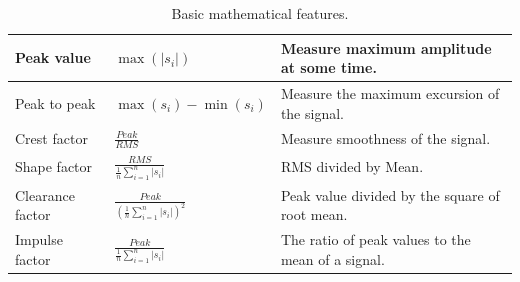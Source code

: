 \begin{table}[ht]
\begin{tabular}{|p{3cm}|p{3cm}|p{6cm}|}
		\vspace{-1mm} Peak value & \vspace{-1mm} \begin{math} \max(|s_{i}|) \end{math} & \vspace{-1mm} Measure maximum amplitude at some time. \\[3ex]
		\hline
		
		\vspace{-1mm} Peak to peak & \vspace{-1mm} \begin{math} \max(s_{i}) - \min(s_{i}) \end{math} & \vspace{-1mm} Measure the maximum excursion of the signal. \\[3ex]
		\hline
		
		\vspace{-1mm} Crest factor & \vspace{-1mm} \begin{math} \frac{Peak}{RMS} \end{math} & \vspace{-1mm} Measure smoothness of the signal. \\[3ex]
		\hline
		
		\vspace{-1mm} Shape factor & \vspace{-1mm} \begin{math} \frac{RMS}{\frac{1}{n} \sum_{i=1}^{n}|s_{i}|} \end{math} & \vspace{-1mm} RMS divided by Mean. \\[3ex]
		\hline
		
		\vspace{-1mm} Clearance factor & \vspace{-1mm} \begin{math} \frac{Peak}{(\frac{1}{n} \sum_{i=1}^{n}|s_{i}|)^2} \end{math} & \vspace{-1mm} Peak value divided by the square of root mean. \\[3ex]
		\hline
		
		
		\vspace{-1mm} Impulse factor & \vspace{-1mm} \begin{math} \frac{Peak}{\frac{1}{n} \sum_{i=1}^{n}|s_{i}|} \end{math} & \vspace{-1mm} The ratio of peak values to the mean of a signal. \\[3ex]
		\hline
	\end{tabular}
	\captionsetup{justification=centering}
	\caption{Basic mathematical features.}	
	\label{table:BasicMathematicalFeatures}
\end{table}

